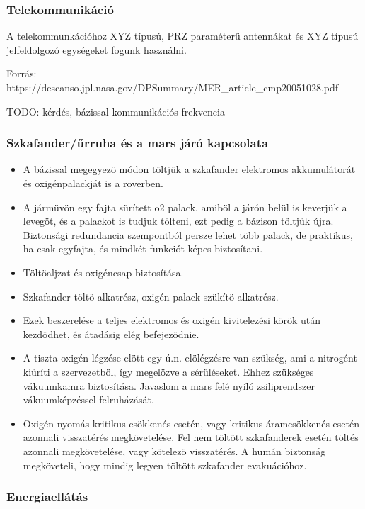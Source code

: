 \documentclass[12pt]{report}
\begin{document}
\subsubsection{Telekommunikáció}

A telekommunkációhoz XYZ típusú, PRZ paraméterű antennákat és XYZ típusú jelfeldolgozó egységeket fogunk használni.

Forrás: https://descanso.jpl.nasa.gov/DPSummary/MER\_article\_cmp20051028.pdf

TODO: kérdés, bázissal kommunikációs frekvencia

\subsubsection{Szkafander/űrruha és a mars járó kapcsolata}
\begin{itemize}

  \item A bázissal megegyezö módon töltjük a szkafander elektromos akkumulátorát és oxigénpalackját is a roverben.
  \item A jármüvön egy fajta sürített o2 palack, amiböl a járón belül is keverjük a levegöt, és a palackot is tudjuk tölteni, ezt pedig a bázison töltjük újra. Biztonsági redundancia szempontból persze lehet több palack, de praktikus, ha csak egyfajta, és mindkét funkciót képes biztosítani.
  \item Töltöaljzat és oxigéncsap biztosítása.
  \item Szkafander töltö alkatrész, oxigén palack szükítö alkatrész.
  \item Ezek beszerelése a teljes elektromos és oxigén kivitelezési körök után kezdödhet, és átadásig elég befejezödnie.
  \item A tiszta oxigén légzése elött egy ú.n. elölégzésre van szükség, ami a nitrogént kiüríti a szervezetböl, így megelözve a sérüléseket. Ehhez szükséges vákuumkamra biztosítása. Javaslom a mars felé nyíló zsiliprendszer vákuumképzéssel felruházását.
  \item Oxigén nyomás kritikus csökkenés esetén, vagy kritikus áramcsökkenés esetén azonnali visszatérés megkövetelése. Fel nem töltött szkafanderek esetén töltés azonnali megkövetelése, vagy kötelezö visszatérés. A humán biztonság megköveteli, hogy mindig legyen töltött szkafander evakuációhoz.
\end{itemize}

\subsubsection{Energiaellátás}
\end{document}
